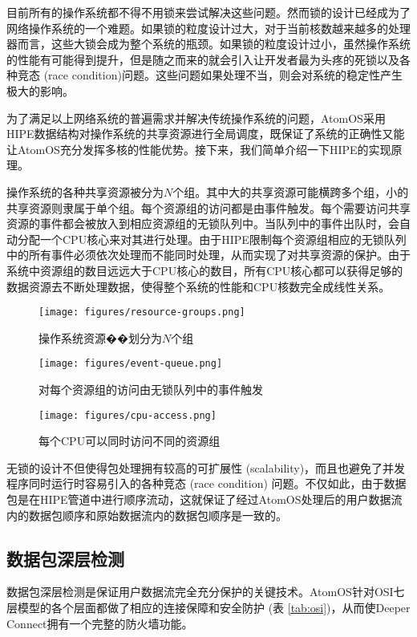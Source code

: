 \documentclass[a4paper]{article}
\begin{document}
目前所有的操作系统都不得不用锁\cite{lock}来尝试解决这些问题。然而锁的设计已经成为了网络操作系统的一个难题。如果锁的粒度设计过大，对于当前核数越来越多的处理器而言，这些大锁会成为整个系统的瓶颈。如果锁的粒度设计过小，虽然操作系统的性能有可能得到提升，但是随之而来的就会引入让开发者最为头疼的死锁以及各种竞态 (race condition)问题。这些问题如果处理不当，则会对系统的稳定性产生极大的影响。

为了满足以上网络系统的普遍需求并解决传统操作系统的问题，AtomOS采用HIPE数据结构对操作系统的共享资源进行全局调度，既保证了系统的正确性又能让AtomOS充分发挥多核的性能优势。接下来，我们简单介绍一下HIPE的实现原理。

操作系统的各种共享资源被分为$N$个组。其中大的共享资源可能横跨多个组，小的共享资源则隶属于单个组。每个资源组的访问都是由事件触发。每个需要访问共享资源的事件都会被放入到相应资源组的无锁队列中。当队列中的事件出队时，会自动分配一个CPU核心来对其进行处理。由于HIPE限制每个资源组相应的无锁队列中的所有事件必须依次处理而不能同时处理，从而实现了对共享资源的保护。由于系统中资源组的数目远远大于CPU核心的数目，所有CPU核心都可以获得足够的数据资源去不断处理数据，使得整个系统的性能和CPU核数完全成线性关系。

\begin{figure}[hhhh]
\centering
\texttt{[image: figures/resource-groups.png]}
\caption{操作系统资源��划分为$N$个组}
\label{fig:resource-groups}
\end{figure}

\begin{figure}[hhhh]
\centering
\texttt{[image: figures/event-queue.png]}
\caption{对每个资源组的访问由无锁队列中的事件触发}
\label{fig:event-queue}
\end{figure}

\begin{figure}[hhhh]
\centering
\texttt{[image: figures/cpu-access.png]}
\caption{每个CPU可以同时访问不同的资源组}
\label{fig:cpu-access}
\end{figure}

无锁的设计不但使得包处理拥有较高的可扩展性 (scalability)，而且也避免了并发程序同时运行时容易引入的各种竞态 (race condition) 问题。不仅如此，由于数据包是在HIPE管道中进行顺序流动，这就保证了经过AtomOS处理后的用户数据流内的数据包顺序和原始数据流内的数据包顺序是一致的。

\subsection{数据包深层检测}
\label{sec:packet-inspection}
数据包深层检测是保证用户数据流完全充分保护的关键技术。AtomOS针对OSI七层模型的各个层面都做了相应的连接保障和安全防护 (表 \ref{tab:osi})，从而使Deeper Connect拥有一个完整的防火墙功能。
\end{document}
